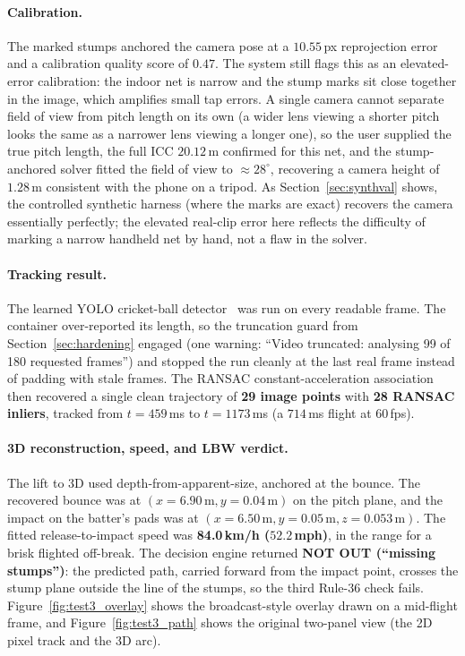 \documentclass[12pt,a4paper]{report}
\begin{document}
\paragraph{Calibration.}
The marked stumps anchored the camera pose at a $10.55$\,px reprojection error and a calibration quality score of $0.47$. The system still flags this as an elevated-error calibration: the indoor net is narrow and the stump marks sit close together in the image, which amplifies small tap errors. A single camera cannot separate field of view from pitch length on its own (a wider lens viewing a shorter pitch looks the same as a narrower lens viewing a longer one), so the user supplied the true pitch length, the full ICC $20.12$\,m confirmed for this net, and the stump-anchored solver fitted the field of view to $\approx 28^{\circ}$, recovering a camera height of $1.28$\,m consistent with the phone on a tripod. As Section~\ref{sec:synthval} shows, the controlled synthetic harness (where the marks are exact) recovers the camera essentially perfectly; the elevated real-clip error here reflects the difficulty of marking a narrow handheld net by hand, not a flaw in the solver.

\paragraph{Tracking result.}
The learned YOLO cricket-ball detector~\cite{redmon2016,ultralytics2023} was run on every readable frame. The container over-reported its length, so the truncation guard from Section~\ref{sec:hardening} engaged (one warning: ``Video truncated: analysing 99 of 180 requested frames'') and stopped the run cleanly at the last real frame instead of padding with stale frames. The RANSAC constant-acceleration association then recovered a single clean trajectory of \textbf{29 image points} with \textbf{28 RANSAC inliers}, tracked from $t = 459$\,ms to $t = 1173$\,ms (a $714$\,ms flight at 60\,fps).

\paragraph{3D reconstruction, speed, and LBW verdict.}
The lift to 3D used depth-from-apparent-size, anchored at the bounce. The recovered bounce was at $(x = 6.90\,\text{m}, y = 0.04\,\text{m})$ on the pitch plane, and the impact on the batter's pads was at $(x = 6.50\,\text{m}, y = 0.05\,\text{m}, z = 0.053\,\text{m})$. The fitted release-to-impact speed was \textbf{84.0\,km/h ($52.2$\,mph)}, in the range for a brisk flighted off-break. The decision engine returned \textbf{NOT OUT (``missing stumps'')}: the predicted path, carried forward from the impact point, crosses the stump plane outside the line of the stumps, so the third Rule-36 check fails. Figure~\ref{fig:test3_overlay} shows the broadcast-style overlay drawn on a mid-flight frame, and Figure~\ref{fig:test3_path} shows the original two-panel view (the 2D pixel track and the 3D arc).
\end{document}
